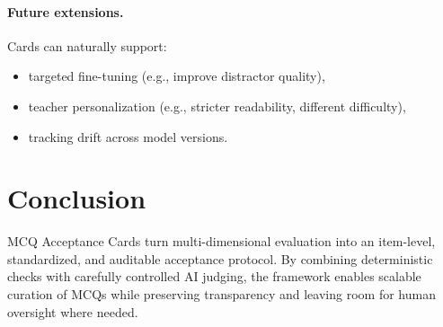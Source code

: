 \documentclass[11pt]{article}
\begin{document}
\paragraph{Future extensions.}
Cards can naturally support:
\begin{itemize}[leftmargin=*]
  \item targeted fine-tuning (e.g., improve distractor quality),
  \item teacher personalization (e.g., stricter readability, different difficulty),
  \item tracking drift across model versions.
\end{itemize}

\section{Conclusion}
MCQ Acceptance Cards turn multi-dimensional evaluation into an item-level, standardized, and auditable acceptance protocol. By combining deterministic checks with carefully controlled AI judging, the framework enables scalable curation of MCQs while preserving transparency and leaving room for human oversight where needed.



\end{document}
